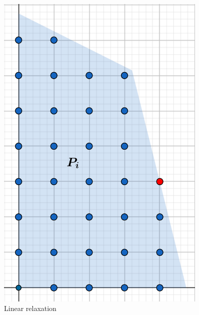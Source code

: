\begin{figure}[h]
\centering
\begin{minipage}[b]{0.45\textwidth}
    \centering
    \includegraphics[width=0.9\textwidth]{images/IP(4).png}
    \caption{Linear relaxation}
\end{minipage}
\hfill
\begin{minipage}[b]{0.45\textwidth}
    \centering

\end{minipage}
\end{figure}
